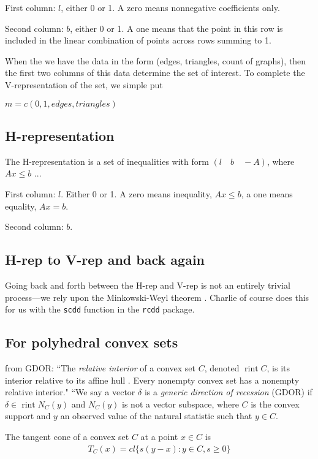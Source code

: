 \documentclass{amsbook}
\DeclareMathOperator{\rintr}{rint}
\theoremstyle{definition}
\theoremstyle{remark}
\begin{document}
First column: $l$, either 0 or 1.  A zero means nonnegative coefficients only.    

Second column: $b$, either 0 or 1.  A one means that the point in this row is included in the linear combination of points across rows summing to 1.

When the we have the data in the form (edges, triangles, count of graphs), then the first two columns of this data determine the set of interest.  To complete the V-representation of the set, we simple put

$m = c(0, 1, edges, triangles )$


\subsection{H-representation}

The H-representation is a set of inequalities with form $(l \quad b \quad -A)$, where
$Ax \leq b$ ... 

First column: $l$.  Either 0 or 1.  A zero means inequality, $Ax \leq b$, a one means equality, $Ax = b$.

Second column: $b$.  

\subsection{H-rep to V-rep and back again} 

Going back and forth between the H-rep and V-rep is not an entirely trivial process---we rely upon the Minkowski-Weyl theorem \citep[Theorem 19.1]{Rockafellar:1970}.  Charlie of course does this for us with the \texttt{scdd} function in the \texttt{rcdd} package.

\subsection{For polyhedral convex sets}
from GDOR: ``The \emph{relative interior} of a convex set $C$, denoted $\rintr C$, is its interior relative to its affine hull \citep{Geyer:gdor, Rockafellar:1970}.  Every nonempty convex set has a nonempty relative interior."
``We say a vector $\delta$ is a \emph{generic direction of recession} (GDOR) if $\delta \in \rintr N_C(y)$ and $N_C(y)$ is not a vector subspace, where $C$ is the convex support and $y$ an observed value of the natural statistic such that $y \in C$.

The tangent cone of a convex set $C$ at a point $x \in C$ is
\begin{align*}
	T_C(x) = cl\{ s(y-x): y \in C, s \geq 0 \}
\end{align*}
\end{document}
